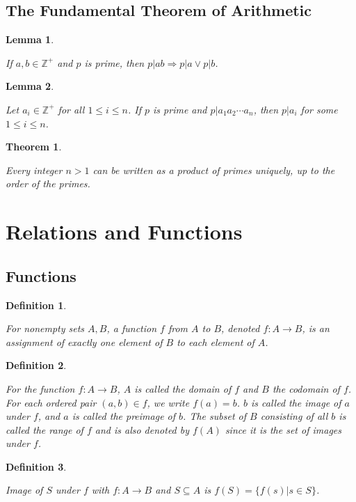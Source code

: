 \documentclass[12pt]{article}
\newtheorem{definition}{Definition} [section]
\newtheorem{theorem}{Theorem} [section]
\newtheorem{lemma}{Lemma} [section]
\begin{document}
\subsection{The Fundamental Theorem of Arithmetic}
\begin{lemma}
\begin{em}
If $a, b \in \mathbb{Z}^+$ and $p$ is prime, then $p|ab \Rightarrow p|a \vee p|b$.
\end{em}
\end{lemma}
\begin{lemma}
\begin{em}
Let $a_i \in \mathbb{Z}^+$ for all $1 \leq i \leq n$. If $p$ is prime and $p|a_1a_2 \cdots a_n$, then $p|a_i$ for some $1 \leq i \leq n$.
\end{em}
\end{lemma}
\begin{theorem}
\begin{em}
Every integer $n > 1$ can be written as a product of primes uniquely, up to the order of the primes.
\end{em}
\end{theorem}
\section{Relations and Functions}
\subsection{Functions}
\begin{definition}
\begin{em}
For nonempty sets $A, B$, a \emph{function} $f$ from $A$ to $B$, denoted $f: A \rightarrow B$, is an assignment of exactly one element of $B$ to each element of $A$.
\end{em}
\end{definition}
\begin{definition}
\begin{em}
For the function $f: A \rightarrow B$, $A$ is called the \emph{domain} of $f$ and $B$ the \emph{codomain} of $f$. For each ordered pair $(a, b) \in f$, we write $f(a) = b$. $b$ is called the \emph{image} of $a$ under $f$, and $a$ is called the \emph{preimage} of $b$. The subset of $B$ consisting of all $b$ is called the \emph{range} of $f$ and is also denoted by $f(A)$ since it is the set of images under $f$.
\end{em}
\end{definition}
\begin{definition}
\begin{em}
Image of $S$ under $f$ with $f: A \rightarrow B$ and $S \subseteq A$ is $f(S) = \{f(s)| s \in S\}$.
\end{em}
\end{definition}
\end{document}
